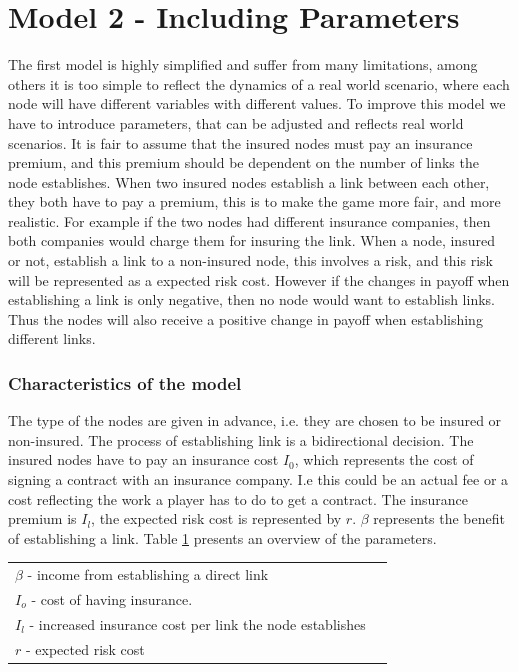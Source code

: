 \section{Model 2 - Including Parameters}
The first model is highly simplified and suffer from many limitations, among others it is too simple to reflect the dynamics of a real world scenario, where each node will have different variables with different values. To improve this model we have to introduce parameters, that can be adjusted and reflects real world scenarios.
It is fair to assume that the insured nodes must pay an insurance premium, and this premium should be dependent on the number of links the node establishes. When two insured nodes establish a link between each other, they both have to pay a premium, this is to make the game more fair, and more realistic. For example if the two nodes had different insurance companies, then both companies would charge them for insuring the link.
When a node, insured or not, establish a link to a non-insured node, this involves a risk, and this risk will be represented as a expected risk cost. However if the changes in payoff when establishing a link is only negative, then no node would want to establish links. Thus the nodes will also receive a positive change in payoff when establishing different links. 

\subsubsection{Characteristics of the model}
The type of the nodes are given in advance, i.e. they are chosen to be insured or non-insured. The process of establishing link is a bidirectional decision. 
The insured nodes have to pay an insurance cost $I_{0}$, which represents the cost of signing a contract with an insurance company. I.e this could be an actual fee or a cost reflecting the work a player has to do to get a contract. The insurance premium is $I_{l}$, the expected risk cost is represented by $r$. $\beta$ represents the benefit of establishing a link.  
Table \ref{tbl:simplegamepara} presents an overview of the parameters. 
\begin{table}[h]
\centering
\begin{tabular}{lc}
 \hline
  $\beta$ - income from establishing a direct link \\
  $I_{o}$ - cost of having insurance. \\
  $I_{l}$ - increased insurance cost per link the node establishes\\
  $r$ - expected risk cost\\
  \hline
\end{tabular}
\label{tbl:simplegamepara}
\end{table}

